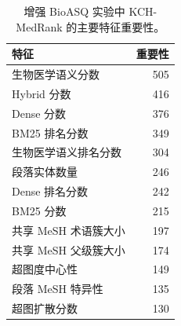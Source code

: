 \begin{table}[t]
\centering
\small
\caption{增强 BioASQ 实验中 KCH-MedRank 的主要特征重要性。}
\label{tab:feature-importance-summary}
\begin{tabular}{lr}
\toprule
特征 & 重要性 \\
\midrule
生物医学语义分数 & 505 \\
Hybrid 分数 & 416 \\
Dense 分数 & 376 \\
BM25 排名分数 & 349 \\
生物医学语义排名分数 & 304 \\
段落实体数量 & 246 \\
Dense 排名分数 & 242 \\
BM25 分数 & 215 \\
共享 MeSH 术语簇大小 & 197 \\
共享 MeSH 父级簇大小 & 174 \\
超图度中心性 & 149 \\
段落 MeSH 特异性 & 135 \\
超图扩散分数 & 130 \\
\bottomrule
\end{tabular}
\end{table}

